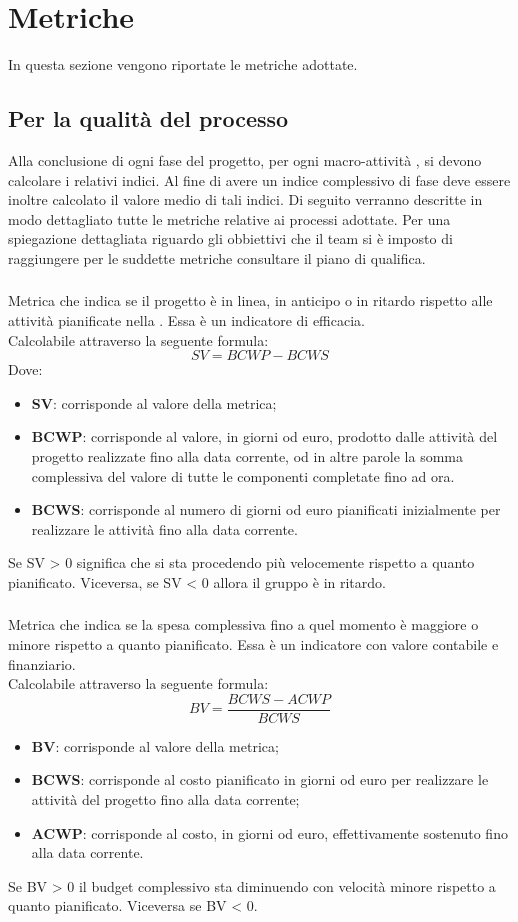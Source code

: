 \section{Metriche}
In questa sezione vengono riportate le metriche adottate.
\subsection{Per la qualità del processo}
Alla conclusione di ogni fase del progetto, per ogni macro-attività , si devono calcolare i relativi indici. Al fine di avere un indice complessivo di fase deve essere inoltre calcolato il valore medio di tali indici. Di seguito verranno descritte in modo dettagliato tutte le metriche relative ai processi adottate. Per una spiegazione dettagliata riguardo gli obbiettivi che il team si è imposto di raggiungere per le suddette metriche consultare il piano di qualifica.
\subsubsection{}\Spazio
Metrica che indica se il progetto è in linea, in anticipo o in ritardo rispetto alle attività pianificate nella . Essa è un indicatore di efficacia. \\
Calcolabile attraverso la seguente formula:
\[ SV=BCWP-BCWS\]
Dove:
\begin{itemize}
	\item {\textbf{SV}: corrisponde al valore della metrica;}
	\item {\textbf{BCWP}: corrisponde al valore, in giorni od euro, prodotto dalle attività del progetto realizzate fino alla data corrente, od in altre parole la somma complessiva del valore di tutte le componenti completate fino ad ora.}
	\item {\textbf{BCWS}: corrisponde al numero di giorni od euro pianificati inizialmente per realizzare le attività fino alla data corrente.}
\end{itemize}
Se SV > 0 significa che si sta procedendo più velocemente rispetto a quanto pianificato. Viceversa, se SV < 0 allora il gruppo è in ritardo.
\subsubsection{}\Spazio
Metrica che indica se la spesa complessiva fino a quel momento è maggiore o minore rispetto a quanto pianificato. Essa è un indicatore con valore contabile e finanziario. \\
Calcolabile attraverso la seguente formula:
\[BV=\frac{BCWS-ACWP}{BCWS}\]
\begin{itemize}
	\item {\textbf{BV}: corrisponde al valore della metrica;}
	\item {\textbf{BCWS}: corrisponde al costo pianificato in giorni od euro per realizzare le attività del progetto fino alla data corrente;}
	\item {\textbf{ACWP}: corrisponde al costo, in giorni od euro, effettivamente sostenuto fino alla data corrente.}
\end{itemize}
Se BV > 0 il budget complessivo sta diminuendo con velocità minore rispetto a quanto pianificato. Viceversa se BV < 0.

